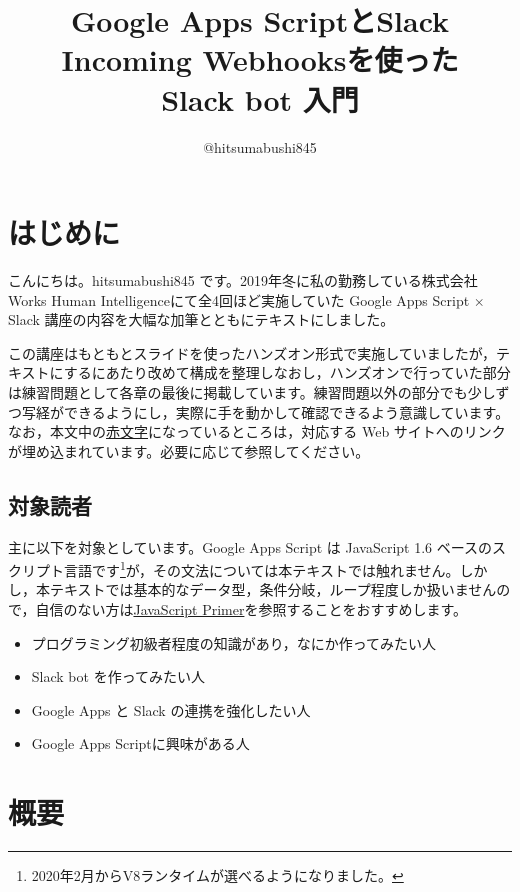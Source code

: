 \documentclass[uplatex,a4j]{jsarticle}
\title{Google Apps ScriptとSlack Incoming Webhooksを使った\\Slack bot 入門}
\author{@hitsumabushi845}
\date{}
\begin{document}
\VerbatimFootnotes

\maketitle
\tableofcontents

\clearpage

\section{はじめに}

こんにちは。hitsumabushi845 です。2019年冬に私の勤務している株式会社Works Human Intelligenceにて全4回ほど実施していた Google Apps Script $\times$ Slack 講座の内容を大幅な加筆とともにテキストにしました。


この講座はもともとスライドを使ったハンズオン形式で実施していましたが，テキストにするにあたり改めて構成を整理しなおし，ハンズオンで行っていた部分は練習問題として各章の最後に掲載しています。練習問題以外の部分でも少しずつ写経ができるようにし，実際に手を動かして確認できるよう意識しています。なお，本文中の\href{http://google.co.jp}{赤文字}になっているところは，対応する Web サイトへのリンクが埋め込まれています。必要に応じて参照してください。

\subsection{対象読者}

主に以下を対象としています。Google Apps Script は JavaScript 1.6 ベースのスクリプト言語です\footnote{2020年2月からV8ランタイムが選べるようになりました。}が，その文法については本テキストでは触れません。しかし，本テキストでは基本的なデータ型，条件分岐，ループ程度しか扱いませんので，自信のない方は\href{https://jsprimer.net/}{JavaScript Primer}を参照することをおすすめします。

\begin{itemize}
\item プログラミング初級者程度の知識があり，なにか作ってみたい人
\item Slack bot を作ってみたい人
\item Google Apps と Slack の連携を強化したい人
\item Google Apps Scriptに興味がある人
\end{itemize}

\clearpage

\section{概要}
\end{document}
